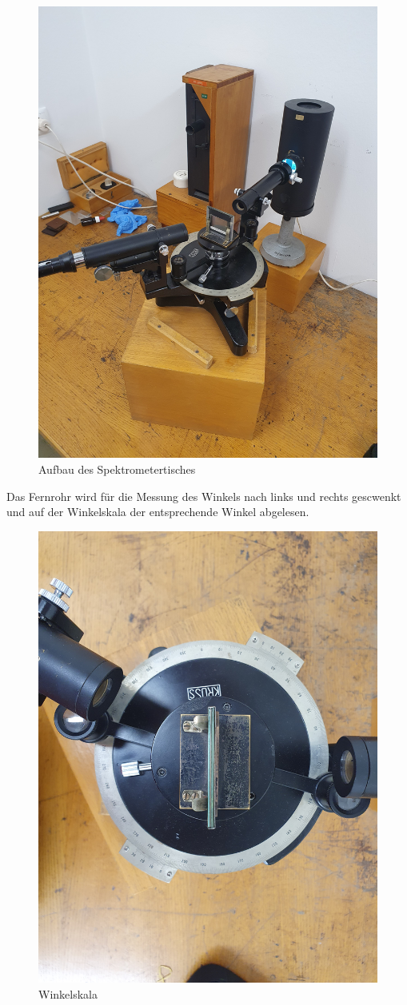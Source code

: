 \documentclass[12pt,a4paper,twoside]{article}
\begin{document}
    \begin{figure}[H]
        \centering
        \includegraphics[width=0.6\linewidth, angle=-90]{nudes/versuch.jpg}
        \caption{Aufbau des Spektrometertisches}
        \label{fig:Aufbau}
    \end{figure}
\noindent
Das Fernrohr wird für die Messung des Winkels nach links und rechts gescwenkt und auf der Winkelskala der entsprechende Winkel abgelesen. 

\begin{figure}[H]
    \centering
    \includegraphics[width=0.6\linewidth, angle=-90]{nudes/messskala.jpg}
    \caption{Winkelskala}
    \label{fig:Winkelskala}
\end{figure}
\end{document}
